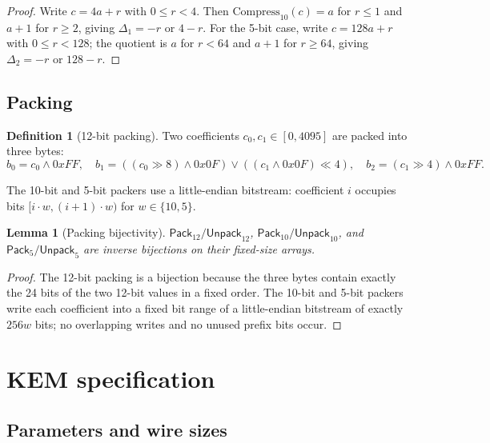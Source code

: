 \documentclass[11pt,a4paper]{article}
\theoremstyle{plain}
\newtheorem{lemma}[theorem]{Lemma}
\theoremstyle{definition}
\newtheorem{definition}[theorem]{Definition}
\theoremstyle{remark}
\newcommand{\Pack}{\mathsf{Pack}}
\newcommand{\Unpack}{\mathsf{Unpack}}
\newcommand{\Compress}{\mathrm{Compress}}
\begin{document}
\begin{proof}
Write $c=4a+r$ with $0\le r<4$.  Then
$\Compress_{10}(c)=a$ for $r\le1$ and $a+1$ for $r\ge2$, giving
$\Delta_1=-r$ or $4-r$.  For the 5-bit case, write $c=128a+r$ with
$0\le r<128$; the quotient is $a$ for $r<64$ and $a+1$ for $r\ge64$,
giving $\Delta_2=-r$ or $128-r$.
\end{proof}

\subsection{Packing}

\begin{definition}[12-bit packing]
Two coefficients $c_0,c_1\in[0,4095]$ are packed into three bytes:
\[
 b_0=c_0\land0xFF,\quad
 b_1=((c_0\gg8)\land0x0F)\lor((c_1\land0x0F)\ll4),\quad
 b_2=(c_1\gg4)\land0xFF.
\]
\end{definition}

The 10-bit and 5-bit packers use a little-endian bitstream:
coefficient $i$ occupies bits $[i\cdot w,(i+1)\cdot w)$ for
$w\in\{10,5\}$.

\begin{lemma}[Packing bijectivity]
\label{lem:pack}
$\Pack_{12}/\Unpack_{12}$, $\Pack_{10}/\Unpack_{10}$, and
$\Pack_5/\Unpack_5$ are inverse bijections on their fixed-size arrays.
\end{lemma}

\begin{proof}
The 12-bit packing is a bijection because the three bytes contain
exactly the 24 bits of the two 12-bit values in a fixed order.  The
10-bit and 5-bit packers write each coefficient into a fixed bit range
of a little-endian bitstream of exactly $256w$ bits; no overlapping
writes and no unused prefix bits occur.
\end{proof}

\section{KEM specification}
\label{sec:kem}

\subsection{Parameters and wire sizes}
\end{document}
